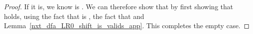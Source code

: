 \begin{isabellebody}
\begin{isamarkuptext}
\begin{lemma}
\begin{proof}
If it is, we know \isa{{\isasymalpha}} is . We can therefore show that 
by first showing that 
holds, using the fact that  is , the fact that 
 and Lemma~\ref{nxt_dfa_LR0_shift_is_valids_app}. This completes the empty case.


\end{proof}
\end{lemma}
\end{isamarkuptext}
\end{isabellebody}
